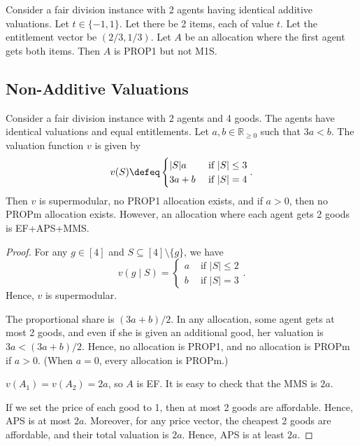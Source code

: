 \begin{example}
\label{cex:prop1-not-m1s-n2}
Consider a fair division instance with 2 agents having identical additive valuations.
Let $t \in \{-1, 1\}$. Let there be 2 items, each of value $t$.
Let the entitlement vector be $(2/3, 1/3)$.
Let $A$ be an allocation where the first agent gets both items.
Then $A$ is PROP1 but not M1S.
\end{example}

\subsection{Non-Additive Valuations}
\label{sec:cex-extra:non-add}

\begin{lemma}
\label{cex:ef-not-prop-supmod}
Consider a fair division instance with 2 agents and 4 goods.
The agents have identical valuations and equal entitlements.
Let $a, b \in \mathbb{R}_{\ge 0}$ such that $3a < b$.
The valuation function $v$ is given by
\[ v(S) \defeq \begin{cases}
|S|a & \textrm{ if } |S| \le 3
\\ 3a + b & \textrm{ if } |S| = 4
\end{cases}. \]
Then $v$ is supermodular, no PROP1 allocation exists,
and if $a > 0$, then no PROPm allocation exists.
However, an allocation where each agent gets 2 goods is EF+APS+MMS.
\end{lemma}
\begin{proof}
For any $g \in [4]$ and $S \subseteq [4] \setminus \{g\}$, we have
\[ v(g \mid S) = \begin{cases}
a & \textrm{ if } |S| \le 2
\\ b & \textrm{ if } |S| = 3
\end{cases}. \]
Hence, $v$ is supermodular.

The proportional share is $(3a + b)/2$.
In any allocation, some agent gets at most 2 goods,
and even if she is given an additional good, her valuation is $3a < (3a+b)/2$.
Hence, no allocation is PROP1, and no allocation is PROPm if $a > 0$.
(When $a = 0$, every allocation is PROPm.)

$v(A_1) = v(A_2) = 2a$, so $A$ is EF.
It is easy to check that the MMS is $2a$.

If we set the price of each good to 1, then at most 2 goods are affordable.
Hence, APS is at most $2a$.
Moreover, for any price vector, the cheapest 2 goods are affordable, and their total valuation is $2a$.
Hence, APS is at least $2a$.
\end{proof}

